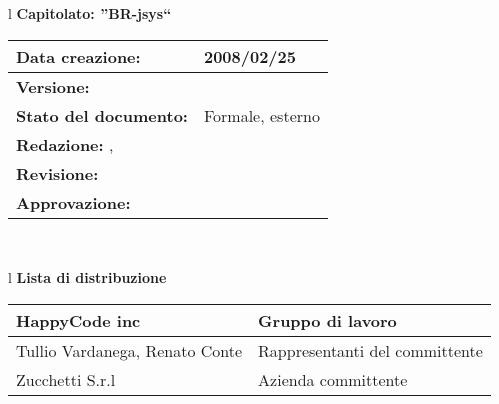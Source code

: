 

\newcommand{\lv}{ 0.3 } %
\newcommand{\dt}{ Manuale Utente }%
\newcommand{\Grammatica}{} %

\begin{center}
\thispagestyle{plain}
\begin{table}[htbp]
\large{
\begin{tabular}{l}
\Large{\textbf{\textsf{Capitolato: ''BR-jsys``}}} \\
\begin{tabular}{|p{6cm}|p{6cm}|} \hline
\textbf{Data creazione:} & 2008/02/25 \\ \hline
\textbf{Versione:} & \\ \hline
\textbf{Stato del documento:} & Formale, esterno \\ \hline
\textbf{Redazione:} \AT, \LA & \\ \hline
\textbf{Revisione:} & \\ \hline
\textbf{Approvazione:} & \\ \hline
\end{tabular} \\
\end{tabular}
}
\end{table}

\begin{table}[hbtp]
\large{
\begin{tabular}{l}
\Large{\textbf{\textsf{Lista di distribuzione}}} \\

\begin{tabular}{|p{6cm}|p{6cm}|} \hline
{HappyCode inc}& Gruppo di lavoro\\ \hline
{Tullio Vardanega, Renato Conte}& Rappresentanti del committente \\ \hline
{Zucchetti S.r.l}& Azienda committente\\ \hline
\end{tabular} \\
\end{tabular}
}
\end{table}
\begin{table}[hbtp]


\end{table}
\end{center}
